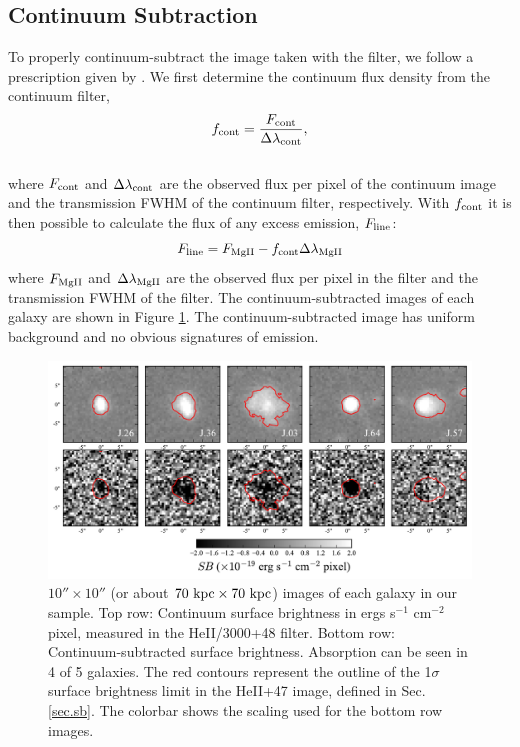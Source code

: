 \documentclass[twocolumn]{aastex62}
\begin{document}
\subsection{Continuum Subtraction}\label{subsec.cont_sub}

To properly continuum-subtract the image taken with the  filter, we follow a prescription given by \cite{Battaia_2015}. 
We first determine the continuum flux density from the continuum filter,
\begin{equation}
f_{\rm{cont}}=\frac{F_{\rm{cont}}}{\Delta \lambda_{\rm{cont}}},
\end{equation}\\
where $F_{\rm{cont}}$ and $\Delta \lambda_{\rm{cont}}$ are the observed flux per pixel of the continuum image and the transmission FWHM of the continuum filter, respectively. With $f_{\rm cont}$ it is then possible to calculate the flux of any excess emission, $F_{\rm{line}}$:
\begin{equation}
F_{\rm{line}}=F_{\rm{MgII}}-f_{\rm{cont}} \Delta \lambda_{\rm{MgII}}
\label{eq:subtraction}
\end{equation}
where $F_{\rm{MgII}}$ and $\Delta \lambda_{\rm MgII}$ are the observed flux per pixel in the  filter and the transmission FWHM of the  filter. The continuum-subtracted images of each galaxy are shown in Figure \ref{fig:stamp_images}. The continuum-subtracted image has uniform background and no obvious signatures of emission.

\begin{figure}[!htb]
\centering
\includegraphics[scale=0.7]{stamps.pdf}
\caption{ $10'' \times 10''$ (or about $70 \rm \ kpc \times 70 \rm \ kpc $) images of each galaxy in our sample. Top row: Continuum surface brightness in ergs s$^{-1}$ cm$^{-2}$ pixel, measured in the HeII/3000+48 filter. Bottom row: Continuum-subtracted  surface brightness.  Absorption can be seen in 4 of 5 galaxies. The red contours represent the outline of the 1$\sigma$ surface brightness limit in the HeII+47 image, defined in Sec. \ref{sec.sb}. The colorbar shows the scaling used for the bottom row  images.}
\label{fig:stamp_images}
\end{figure}
\end{document}
